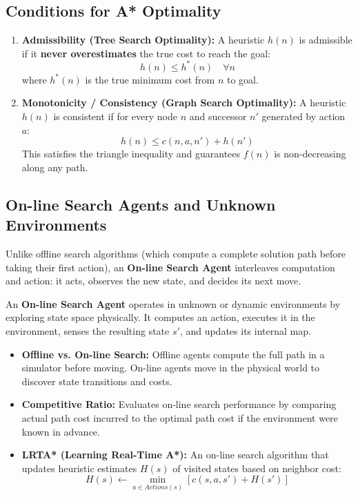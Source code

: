 \documentclass[12pt,a4paper]{article}
\begin{document}
\subsection{Conditions for A* Optimality}
\begin{enumerate}[leftmargin=*, itemsep=4pt]
  \item \textbf{Admissibility (Tree Search Optimality):}
    A heuristic $h(n)$ is admissible if it \textbf{never overestimates} the true cost to reach the goal:
    \begin{equation}
      h(n) \le h^*(n) \quad \forall n
    \end{equation}
    where $h^*(n)$ is the true minimum cost from $n$ to goal.
  
  \item \textbf{Monotonicity / Consistency (Graph Search Optimality):}
    A heuristic $h(n)$ is consistent if for every node $n$ and successor $n'$ generated by action $a$:
    \begin{equation}
      h(n) \le c(n, a, n') + h(n')
    \end{equation}
    This satisfies the triangle inequality and guarantees $f(n)$ is non-decreasing along any path.
\end{enumerate}

\subsection{On-line Search Agents and Unknown Environments}
Unlike offline search algorithms (which compute a complete solution path before taking their first action), an \textbf{On-line Search Agent} interleaves computation and action: it acts, observes the new state, and decides its next move.

\begin{tcolorbox}[defbox, title={On-line Search Agent}]
  An \textbf{On-line Search Agent} operates in unknown or dynamic environments by exploring state space physically. It computes an action, executes it in the environment, senses the resulting state $s'$, and updates its internal map.
\end{tcolorbox}

\begin{itemize}[leftmargin=*, itemsep=3pt]
  \item \textbf{Offline vs. On-line Search:} Offline agents compute the full path in a simulator before moving. On-line agents move in the physical world to discover state transitions and costs.
  \item \textbf{Competitive Ratio:} Evaluates on-line search performance by comparing actual path cost incurred to the optimal path cost if the environment were known in advance.
  \item \textbf{LRTA* (Learning Real-Time A*):} An on-line search algorithm that updates heuristic estimates $H(s)$ of visited states based on neighbor cost:
    \begin{equation}
      H(s) \leftarrow \min_{a \in Actions(s)} \left[ c(s, a, s') + H(s') \right]
    \end{equation}
\end{itemize}
\end{document}
